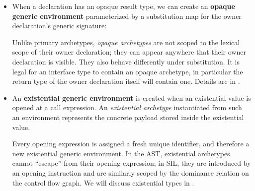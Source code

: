 \documentclass[../generics]{subfiles}
\begin{document}
\begin{itemize}
\item When a declaration has an opaque result type, we can create an \textbf{opaque generic environment} parameterized by a substitution map for the owner declaration's generic signature:
\begin{tightcenter}
\end{tightcenter}
Unlike primary archetypes, \emph{opaque archetypes} are not scoped to the lexical scope of their owner declaration; they can appear anywhere that their owner declaration is visible. They also behave differently under substitution. It is legal for an interface type to contain an opaque archetype, in particular the return type of the owner declaration itself will contain one. Details are in .
\item An \textbf{existential generic environment} is created when an existential value is opened at a call expression. An \emph{existential archetype} instantiated from such an environment represents the concrete payload stored inside the existential value.
\begin{tightcenter}
\end{tightcenter}
Every opening expression is assigned a fresh unique identifier, and therefore a new existential generic environment. In the AST, existential archetypes cannot ``escape'' from their opening expression; in SIL, they are introduced by an opening instruction and are similarly scoped by the dominance relation on the control flow graph. We will discuss existential types in .
\end{itemize}
\end{document}
